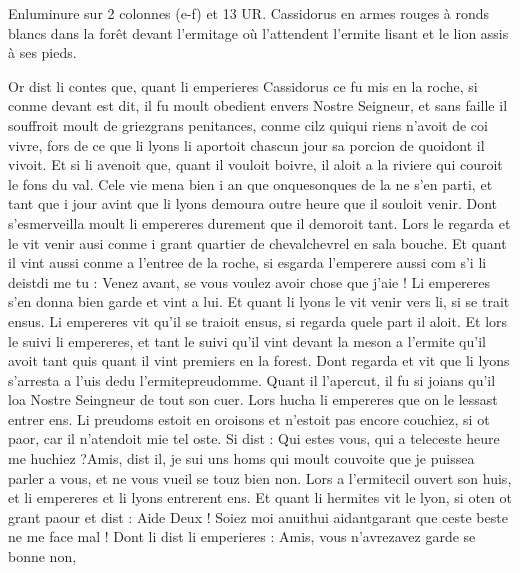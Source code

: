 \documentclass{article}
\begin{document}
\begin{pages}
               Enluminure sur 2 colonnes (e-f) et 13 UR. Cassidorus 
                  en armes rouges à ronds blancs dans la forêt devant 
                  l’ermitage où l’attendent 
                  l’ermite lisant et le lion assis à ses pieds.
               
            
\pstart Or dist li contes que,
   quant li emperieres Cassidorus ce fu mis en la roche,
   si conme devant est dit, il fu moult obedient envers Nostre Seigneur,
   et sans faille il souffroit moult de 
   griezgrans penitances, 
   conme cilz quiqui riens n’avoit de coi vivre,
   fors de ce que li lyons 
   li aportoit chascun jour sa porcion de quoidont il vivoit. 
   Et si li avenoit que, quant il vouloit boivre, il aloit a la riviere qui couroit le fons du val. 
   Cele vie mena bien i an que onquesonques de la ne s’en parti, 
   et tant que i jour avint que li lyons demoura outre heure que il souloit venir. 
               Dont s’esmerveilla moult li empereres durement que il demoroit tant. 
   Lors le regarda et le vit venir ausi conme i grant quartier de 
   chevalchevrel en sala 
   bouche. Et quant il vint aussi conme a l’entree de la roche, si esgarda l’emperere aussi 
   com s’i li deistdi me tu : 
   Venez avant, se vous voulez avoir chose que j’aie !
               Li empereres s’en donna bien garde et vint a lui. 
               Et quant li lyons le vit venir vers li, si se trait ensus. 
   Li empereres 
   vit qu’il se traioit ensus, si regarda quele part il aloit. 
      Et lors le suivi 
   li empereres, 
   et tant le suivi qu’il vint devant la meson a l’ermite 
   qu’il avoit tant quis quant il vint premiers en la forest. 
   Dont regarda et vit que li lyons s’arresta a l’uis 
   dedu 
   l’ermitepreudomme. 
               Quant il l’apercut, il fu si joians qu’il loa Nostre Seingneur de tout son cuer. Lors hucha 
               li empereres que on le lessast entrer ens. 
               Li preudoms estoit en oroisons et n’estoit pas encore couchiez, 
               si ot paor, car il n’atendoit mie tel oste. Si dist :
   Qui estes vous, qui a teleceste heure 
      me huchiez ?Amis, dist il, je sui uns homs qui moult couvoite 
      que je puissea parler a vous, et ne vous vueil se touz bien non. \pend
\pstart Lors a 
   l’ermitecil ouvert son huis, 
   et li empereres et li lyons entrerent ens. 
   Et quant li hermites vit le lyon, 
   si oten ot grant paour et dist :
   Aide Deux ! Soiez moi anuithui 
      aidantgarant que ceste beste ne me face mal !
   Dont li dist li emperieres :
   Amis, vous n’avrezavez garde se bonne non, 

\end{pages}
\end{document}
